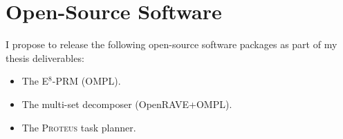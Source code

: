 \section{Open-Source Software}

I propose to release the following open-source software packages
as part of my thesis deliverables:
\begin{itemize}
\item The E$^8$-PRM (OMPL).
\item The multi-set decomposer (OpenRAVE+OMPL).
\item The \textsc{Proteus} task planner.
\end{itemize}

